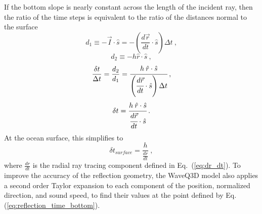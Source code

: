 \documentclass{ws-jca}
\begin{document}
If the bottom slope is nearly constant across the length of the incident
ray, then the ratio of the time steps is equivalent to the ratio of the
distances normal to the surface
\begin{equation}
	d_1 \equiv - \vec{I} \cdot \hat{s} 
		= - \left( \frac{d\vec{r}}{dt} \cdot \hat{s} \right) \Delta t \:,
	\label{eq:reflection_d1}
\end{equation}
\begin{equation}
	d_2 \equiv - h \hat{r} \cdot \hat{s} \:,
	\label{eq:reflection_d2}
\end{equation}
\begin{equation}
	\frac{\delta t}{\Delta t} = \frac{d_2}{d_1} 
		= \cfrac{h \: \hat{r} \cdot \hat{s}}{\left( \cfrac{d\vec{r}}{dt} 
		\cdot \hat{s} \right) \Delta t} \:,
	\label{eq:reflection_ratio}
\end{equation}
\begin{equation}
	\delta t = \cfrac{h \: \hat{r} \cdot \hat{s}}{\cfrac{d\vec{r}}{dt} \cdot \hat{s}} \:.
	\label{eq:reflection_time_bottom}
\end{equation}
At the ocean surface, this simplifies to
\begin{equation}
	\delta t_{surface} = \frac{h}{\frac{dr}{dt}} \:,
	\label{eq:reflection_time_surface}
\end{equation}
where \(\frac{dr}{dt}\) is the radial ray tracing component defined in
Eq.~(\ref{eq:dr_dt}).
To improve the accuracy of the reflection geometry, the WaveQ3D model also
applies a second order Taylor expansion to each component of the position,
normalized direction, and sound speed, to find their values at the point
defined by Eq. (\ref{eq:reflection_time_bottom}).
\end{document}
